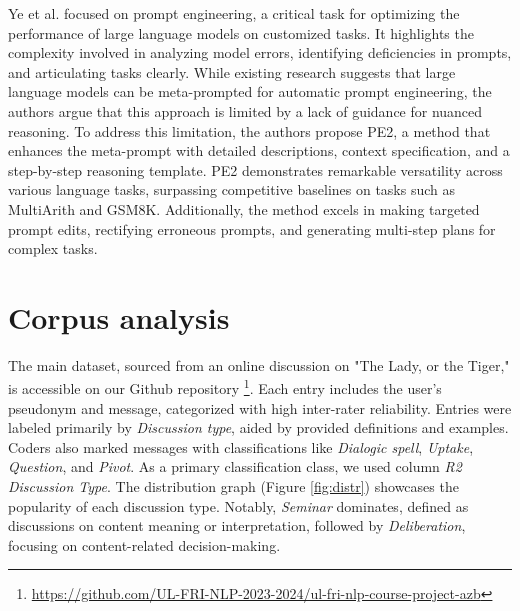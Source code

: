 \documentclass[fleqn,moreauthors,10pt]{ds_report}
\begin{document}
Ye et al. \cite{ye2024prompt} focused on prompt engineering, a critical task for optimizing the performance of large language models on customized tasks. It highlights the complexity involved in analyzing model errors, identifying deficiencies in prompts, and articulating tasks clearly. While existing research suggests that large language models can be meta-prompted for automatic prompt engineering, the authors argue that this approach is limited by a lack of guidance for nuanced reasoning. To address this limitation, the authors propose PE2, a method that enhances the meta-prompt with detailed descriptions, context specification, and a step-by-step reasoning template. PE2 demonstrates remarkable versatility across various language tasks, surpassing competitive baselines on tasks such as MultiArith and GSM8K. Additionally, the method excels in making targeted prompt edits, rectifying erroneous prompts, and generating multi-step plans for complex tasks.

\section*{Corpus analysis}
The main dataset, sourced from an online discussion on "The Lady, or the Tiger," is accessible on our Github repository \footnote{\url{https://github.com/UL-FRI-NLP-2023-2024/ul-fri-nlp-course-project-azb}}. Each entry includes the user's pseudonym and message, categorized with high inter-rater reliability. Entries were labeled primarily by \textit{Discussion type}, aided by provided definitions and examples. Coders also marked messages with classifications like \textit{Dialogic spell}, \textit{Uptake}, \textit{Question}, and \textit{Pivot}. As a primary classification class, we used column \textit{R2 Discussion Type}. The distribution graph (Figure \ref{fig:distr}) showcases the popularity of each discussion type. Notably, \textit{Seminar} dominates, defined as discussions on content meaning or interpretation, followed by \textit{Deliberation}, focusing on content-related decision-making. 
\end{document}
